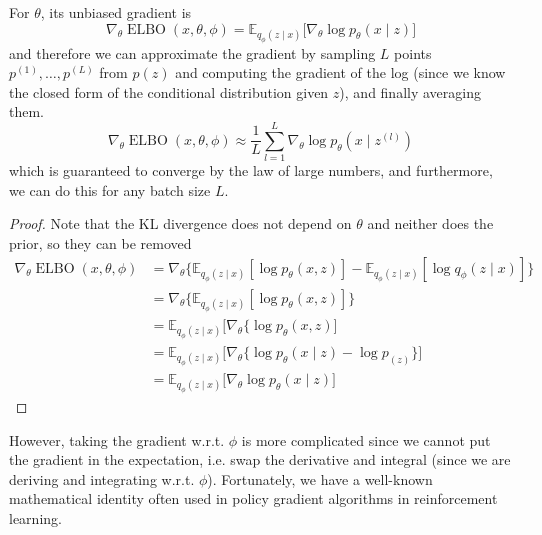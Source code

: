 \documentclass{article}
\DeclareMathOperator{\elbo}{ELBO}
\begin{document}
  \begin{lemma}
    For $\theta$, its unbiased gradient is 
    \begin{equation}
      \nabla_\theta \elbo(x, \theta, \phi) = \mathbb{E}_{q_\phi (z \mid x)} \big[ \nabla_\theta \log p_\theta (x \mid z) \big]
    \end{equation}
    and therefore we can approximate the gradient by sampling $L$ points $p^{(1)}, \ldots, p^{(L)}$ from $p(z)$ and computing the gradient of the log (since we know the closed form of the conditional distribution given $z$), and finally averaging them. 
    \begin{equation}
      \nabla_\theta \elbo(x, \theta, \phi) \approx \frac{1}{L} \sum_{l=1}^L \nabla_\theta \log p_\theta (x \mid z^{(l)})
    \end{equation}
    which is guaranteed to converge by the law of large numbers, and furthermore, we can do this for any batch size $L$.  
  \end{lemma}
  \begin{proof}
    Note that the KL divergence does not depend on $\theta$ and neither does the prior, so they can be removed 
    \begin{align} 
      \nabla_\theta \elbo(x, \theta, \phi) & = \nabla_\theta \big\{ \mathbb{E}_{q_\phi (z \mid x)} [ \log p_\theta (x, z)] - \mathbb{E}_{q_\phi (z \mid x)} [\log q_{\phi} (z \mid x)] \} \\ 
                                           & = \nabla_\theta \big\{ \mathbb{E}_{q_\phi (z \mid x)} [ \log p_\theta (x, z)] \} \\ 
                                           & = \mathbb{E}_{q_\phi (z \mid x)} \big[ \nabla_\theta \{ \log p_\theta (x, z) \big] \\
                                           & = \mathbb{E}_{q_\phi (z \mid x)} \big[ \nabla_\theta \{ \log p_\theta (x \mid z) - \log p_(z) \} \big] \\
                                           & = \mathbb{E}_{q_\phi (z \mid x)} \big[ \nabla_\theta \log p_\theta (x \mid z) \big] 
    \end{align}
  \end{proof}

  However, taking the gradient w.r.t. $\phi$ is more complicated since we cannot put the gradient in the expectation, i.e. swap the derivative and integral (since we are deriving and integrating w.r.t. $\phi$). Fortunately, we have a well-known mathematical identity often used in policy gradient algorithms in reinforcement learning. \cite{W92} 
\end{document}
